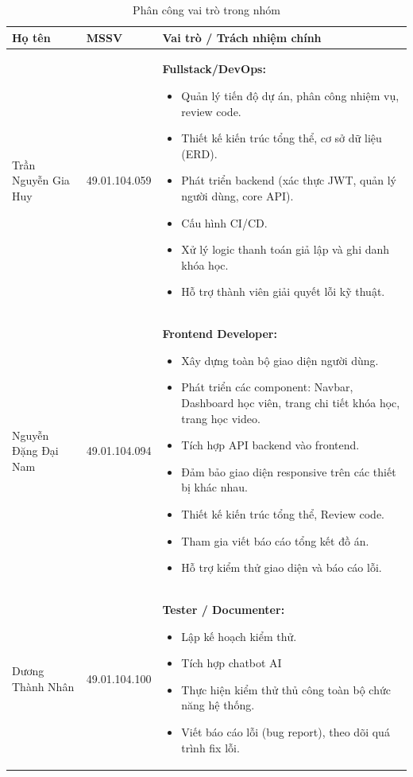 \begin{table}[H]
\centering
\caption{Phân công vai trò trong nhóm}
\label{tab:roles}
\begin{tabular}{|p{3.2cm}|p{2.3cm}|p{9cm}|}
\hline
\textbf{Họ tên} & \textbf{MSSV} & \textbf{Vai trò / Trách nhiệm chính} \\ \hline
Trần Nguyễn Gia Huy & 49.01.104.059 & \textbf{Fullstack/DevOps:} 
\begin{itemize}[leftmargin=*, nosep]
    \item Quản lý tiến độ dự án, phân công nhiệm vụ, review code.
    \item Thiết kế kiến trúc tổng thể, cơ sở dữ liệu (ERD).
    \item Phát triển backend (xác thực JWT, quản lý người dùng, core API).
    \item Cấu hình CI/CD.
    \item  Xử lý logic thanh toán giả lập và ghi danh khóa học.
    \item Hỗ trợ thành viên giải quyết lỗi kỹ thuật.
\end{itemize} \\ \hline
Nguyễn Đặng Đại Nam & 49.01.104.094 & \textbf{Frontend Developer:}
\begin{itemize}[leftmargin=*, nosep]
    \item Xây dựng toàn bộ giao diện người dùng.
    \item Phát triển các component: Navbar, Dashboard học viên, trang chi tiết khóa học, trang học video.
    \item Tích hợp API backend vào frontend.
    \item Đảm bảo giao diện responsive trên các thiết bị khác nhau.
    \item Thiết kế kiến trúc tổng thể, Review code.
    \item Tham gia viết báo cáo tổng kết đồ án.
    \item Hỗ trợ kiểm thử giao diện và báo cáo lỗi.
\end{itemize} \\ \hline
Dương Thành Nhân & 49.01.104.100 & \textbf{Tester / Documenter:}
\begin{itemize}[leftmargin=*, nosep]
    \item Lập kế hoạch kiểm thử.
    \item Tích hợp chatbot AI
    \item Thực hiện kiểm thử thủ công toàn bộ chức năng hệ thống.
    \item Viết báo cáo lỗi (bug report), theo dõi quá trình fix lỗi.

\end{itemize}
\end{tabular}
\end{table}
